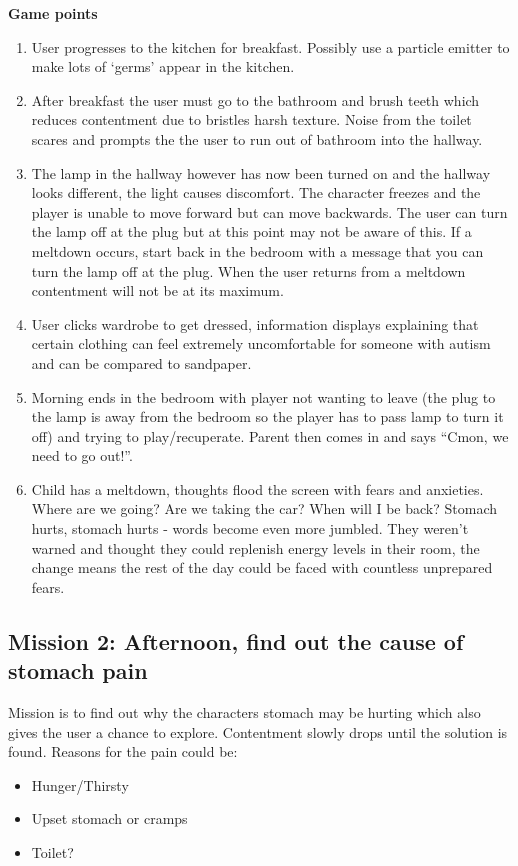 \textbf{Game points}
\begin{enumerate}
\item User progresses to the kitchen for breakfast. Possibly use a particle emitter to make lots of ‘germs’ appear in the kitchen.
\item After breakfast the user must go to the bathroom and brush teeth which reduces contentment due to bristles harsh texture. Noise from the toilet scares and prompts the the user to run out of bathroom into the hallway.
\item The lamp in the hallway however has now been turned on and the hallway looks different, the light causes discomfort. The character freezes and the player is unable to move forward but can move backwards. The user can turn the lamp off at the plug but at this point may not be aware of this. If a meltdown occurs, start back in the bedroom with a message that you can turn the lamp off at the plug. When the user returns from a meltdown contentment will not be at its maximum.
\item User clicks wardrobe to get dressed, information displays explaining that certain clothing can feel extremely uncomfortable for someone with autism and can be compared to sandpaper.
\item Morning ends in the bedroom with player not wanting to leave (the plug to the lamp is away from the bedroom so the player has to pass lamp to turn it off) and trying to play/recuperate. Parent then comes in and says “Cmon, we need to go out!”.
\item Child has a meltdown, thoughts flood the screen with fears and anxieties. Where are we going? Are we taking the car? When will I be back? Stomach hurts, stomach hurts - words become even more jumbled. They weren't warned and thought they could replenish energy levels in their room, the change means the rest of the day could be faced with countless unprepared fears.
\end{enumerate}

\subsection*{Mission 2: Afternoon, find out the cause of stomach pain}
Mission is to find out why the characters stomach may be hurting which also gives the user a chance to explore. Contentment slowly drops until the solution is found. Reasons for the pain could be:

\begin{itemize}
\item Hunger/Thirsty
\item Upset stomach or cramps
\item Toilet?
\end{itemize}

